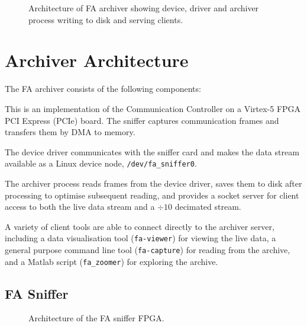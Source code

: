 \documentclass{JAC2003}
\begin{document}
\begin{figure}[!ht]

\caption{Architecture of FA archiver showing device, driver and archiver process
writing to disk and serving clients.}
\label{architecture}
\end{figure}


\section{Archiver Architecture}

The FA archiver consists of the following components:
\begin{description}[noitemsep]

\item[FA Sniffer.]  This is an implementation of the Communication Controller on
a Virtex-5 FPGA PCI Express (PCIe) board. The sniffer captures communication
frames and transfers them by DMA to memory.

\item[Sniffer device driver.]  The device driver communicates with the sniffer
card and makes the data stream available as a Linux device node,
\texttt{\small/dev/fa\_sniffer0}.

\item[Archiver process.]  The archiver process reads frames from the device
driver, saves them to disk after processing to optimise subsequent reading, and
provides a socket server for client access to both the live data stream and a
$\div10$ decimated stream.

\item[Client tools.]  A variety of client tools are able to connect directly to
the archiver server, including a data visualisation tool (\texttt{fa-viewer})
for viewing the live data, a general purpose command line tool
(\texttt{fa-capture}) for reading from the archive, and a Matlab script
(\texttt{fa\_zoomer}) for exploring the archive.

\end{description}


\subsection{FA Sniffer}

\begin{figure}[ht]
\centering

\caption{Architecture of the FA sniffer FPGA.}
\label{fa-sniffer}
\end{figure}
\end{document}
